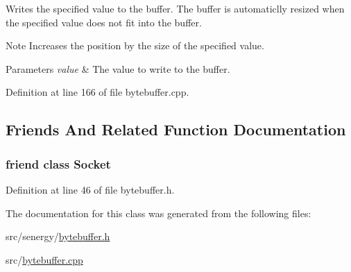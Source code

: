 Writes the specified value to the buffer. The buffer is automaticlly resized when the specified value does not fit into the buffer. 

\begin{DoxyNote}{Note}
Increases the position by the size of the specified value.
\end{DoxyNote}

\begin{DoxyParams}{Parameters}
{\em value} & The value to write to the buffer. \\
\hline
\end{DoxyParams}


Definition at line 166 of file bytebuffer.\-cpp.



\subsection{Friends And Related Function Documentation}
\hypertarget{class_senergy_1_1_byte_buffer_ab510887d735ee73ab1cb598c66260e87}{
\subsubsection[{Socket}]{\setlength{\rightskip}{0pt plus 5cm}friend class {\bf Socket}\hspace{0.3cm}{\ttfamily [friend]}}}\label{class_senergy_1_1_byte_buffer_ab510887d735ee73ab1cb598c66260e87}


Definition at line 46 of file bytebuffer.\-h.



The documentation for this class was generated from the following files\-:\begin{DoxyCompactItemize}
\item 
src/senergy/\hyperlink{bytebuffer_8h}{bytebuffer.\-h}\item 
src/\hyperlink{bytebuffer_8cpp}{bytebuffer.\-cpp}\end{DoxyCompactItemize}

